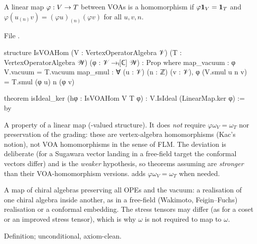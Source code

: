 \begin{definition}[Homomorphism]\label{l04:def:hom}
A linear map $\varphi:V\to T$ between VOAs is a homomorphism if $\varphi\mathbf{1}_V =
\mathbf{1}_T$ and $\varphi(u_{(n)}v) = (\varphi u)_{(n)}(\varphi v)$ for all $u,v,n$.
\end{definition}
\noindent File .
\begin{leancode}
structure IsVOAHom (V : VertexOperatorAlgebra 𝒱) (T : VertexOperatorAlgebra 𝒲)
    (φ : 𝒱 →ₗ[ℂ] 𝒲) : Prop where
  map_vacuum : φ V.vacuum = T.vacuum
  map_smul : ∀ (u : 𝒱) (n : ℤ) (v : 𝒱), φ (V.smul u n v) = T.smul (φ u) n (φ v)

theorem isIdeal_ker (hφ : IsVOAHom V T φ) : V.IsIdeal (LinearMap.ker φ) := by
\end{leancode}
\begin{dictionary}
A property of a linear map (-valued structure). It does \emph{not} require
$\varphi\omega_V = \omega_T$ nor preservation of the grading: these are vertex-algebra homomorphisms
(Kac's notion), not VOA homomorphisms in the sense of FLM. The deviation is deliberate (for a
Sugawara vector landing in a free-field target the conformal vectors differ) and is the
\emph{weaker} hypothesis, so theorems assuming  are \emph{stronger} than their
VOA-homomorphism versions.  adds $\varphi\omega_V = \omega_T$ when needed.
\end{dictionary}
\begin{physics}
A map of chiral algebras preserving all OPEs and the vacuum: a realisation of one chiral algebra
inside another, as in a free-field (Wakimoto, Feigin--Fuchs) realisation or a conformal embedding.
The stress tensors may differ (as for a coset or an improved stress tensor), which is why $\omega$ is
not required to map to $\omega$.
\end{physics}
\begin{status}
Definition;  unconditional, axiom-clean.
\end{status}


